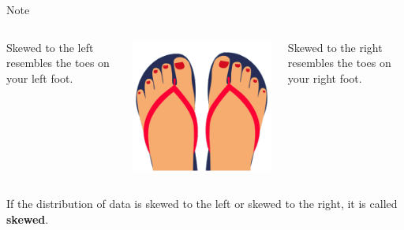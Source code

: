 \documentclass{beamer}
\begin{document}
\begin{frame}
\begin{block}{Note}
\begin{columns}
\begin{column}{0.18\textwidth}
Skewed to the left resembles the toes on your left foot.
\end{column}
\begin{column}{0.55\textwidth}
\includegraphics[width=\textwidth]{feet.png}
\end{column}
\begin{column}{0.18\textwidth}
Skewed to the right resembles the toes on your right foot.
\end{column}
\end{columns}
\end{block}\pause

\begin{definition}
If the distribution of data is skewed to the left or skewed to the right, it is called \textbf{skewed}.
\end{definition}
\end{frame}
\end{document}
